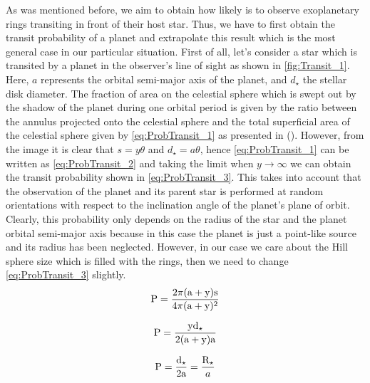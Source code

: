 As was mentioned before, we aim to obtain how likely is to observe exoplanetary rings transiting in front of their host star. Thus, we have to first obtain the transit probability of a planet and extrapolate this result which is the most general case in our particular situation. First of all, let's consider a star which is transited by a planet in the observer's line of sight as shown in \autoref{fig:Transit_1}. Here, $a$ represents the orbital semi-major axis of the planet, and $d_\star$ the stellar disk diameter. The fraction of area on the celestial sphere which is swept out by the shadow of the planet during one orbital period is given by the ratio between the annulus projected onto the celestial sphere and the total superficial area of the celestial sphere given by \autoref{eq:ProbTransit_1} as presented in  (\citeyear{1984Icar...58..121B}). However, from the image it is clear that $s = y\theta$ and $d_\star = a\theta$, hence \autoref{eq:ProbTransit_1} can be written as \autoref{eq:ProbTransit_2} and taking the limit when $y \rightarrow \infty$ we can obtain the transit probability shown in \autoref{eq:ProbTransit_3}. This takes into account that the observation of the planet and its parent star is performed at random orientations with respect to the inclination angle of the planet's plane of orbit. Clearly, this probability only depends on the radius of the star and the planet orbital semi-major axis because in this case the planet is just a point-like source and its radius has been neglected. However, in our case we care about the Hill sphere size which is filled with the rings, then we need to change \autoref{eq:ProbTransit_3} slightly.\\ 

\begingroup
\Large
\begin{equation}
\textnormal{P} = \frac{2\pi (\textnormal{a} + \textnormal{y}) \textnormal{s}}{4\pi (\textnormal{a} + \textnormal{y})^2}
 \label{eq:ProbTransit_1}
\end{equation}
\endgroup

\begingroup
\Large
\begin{equation}
\textnormal{P} = \frac{\textnormal{y} \textnormal{d}_\star}{2 (\textnormal{a} + \textnormal{y}) \textnormal{a}}
 \label{eq:ProbTransit_2}
\end{equation}
\endgroup

\begingroup
\Large
\begin{equation}
\textnormal{P} = \frac{\textnormal{d}_\star}{2 \textnormal{a}} = \frac{\textnormal{R}_\star}{a}
 \label{eq:ProbTransit_3}
\end{equation}
\endgroup\\

